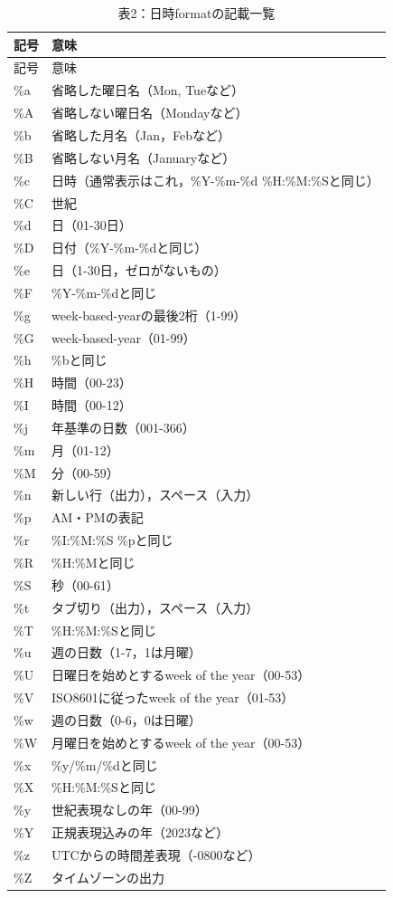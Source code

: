 \documentclass[
  letterpaper,
  DIV=11,
  numbers=noendperiod]{scrreprt}
\begin{document}
\begin{longtable}[]{@{}ll@{}}
\caption{表2：日時formatの記載一覧}\tabularnewline
\toprule()
記号 & 意味 \\
\midrule()
\endfirsthead
\toprule()
記号 & 意味 \\
\midrule()
\endhead
\%a & 省略した曜日名（Mon, Tueなど） \\
\%A & 省略しない曜日名（Mondayなど） \\
\%b & 省略した月名（Jan，Febなど） \\
\%B & 省略しない月名（Januaryなど） \\
\%c & 日時（通常表示はこれ，\%Y-\%m-\%d \%H:\%M:\%Sと同じ） \\
\%C & 世紀 \\
\%d & 日（01-30日） \\
\%D & 日付（\%Y-\%m-\%dと同じ） \\
\%e & 日（1-30日，ゼロがないもの） \\
\%F & \%Y-\%m-\%dと同じ \\
\%g & week-based-yearの最後2桁（1-99） \\
\%G & week-based-year（01-99） \\
\%h & \%bと同じ \\
\%H & 時間（00-23） \\
\%I & 時間（00-12） \\
\%j & 年基準の日数（001-366） \\
\%m & 月（01-12） \\
\%M & 分（00-59） \\
\%n & 新しい行（出力），スペース（入力） \\
\%p & AM・PMの表記 \\
\%r & \%I:\%M:\%S \%pと同じ \\
\%R & \%H:\%Mと同じ \\
\%S & 秒（00-61） \\
\%t & タブ切り（出力），スペース（入力） \\
\%T & \%H:\%M:\%Sと同じ \\
\%u & 週の日数（1-7，1は月曜） \\
\%U & 日曜日を始めとするweek of the year（00-53） \\
\%V & ISO8601に従ったweek of the year（01-53） \\
\%w & 週の日数（0-6，0は日曜） \\
\%W & 月曜日を始めとするweek of the year（00-53） \\
\%x & \%y/\%m/\%dと同じ \\
\%X & \%H:\%M:\%Sと同じ \\
\%y & 世紀表現なしの年（00-99） \\
\%Y & 正規表現込みの年（2023など） \\
\%z & UTCからの時間差表現（-0800など） \\
\%Z & タイムゾーンの出力 \\
\bottomrule()
\end{longtable}
\end{document}
